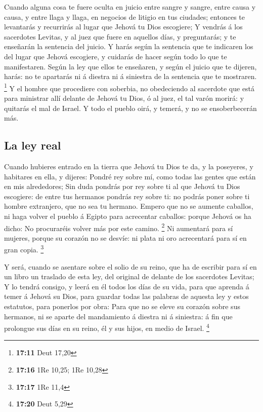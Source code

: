  Cuando alguna cosa te fuere oculta en juicio entre sangre
y sangre, entre causa y causa, y entre llaga y llaga, en negocios de
litigio en tus ciudades; entonces te levantarás y recurrirás al lugar
que Jehová tu Dios escogiere;  Y vendrás á los sacerdotes
Levitas, y al juez que fuere en aquellos días, y preguntarás; y te
enseñarán la sentencia del juicio.  Y harás según la
sentencia que te indicaren los del lugar que Jehová escogiere, y
cuidarás de hacer según todo lo que te manifestaren. 
Según la ley que ellos te enseñaren, y según el juicio que te dijeren,
harás: no te apartarás ni á diestra ni á siniestra de la sentencia que
te mostraren. \footnote{\textbf{17:11} Deut 17,20}  Y el
hombre que procediere con soberbia, no obedeciendo al sacerdote que está
para ministrar allí delante de Jehová tu Dios, ó al juez, el tal varón
morirá: y quitarás el mal de Israel.  Y todo el pueblo
oirá, y temerá, y no se ensoberbecerán más.

\hypertarget{la-ley-real}{%
\subsection{La ley real}\label{la-ley-real}}

 Cuando hubieres entrado en la tierra que Jehová tu Dios
te da, y la poseyeres, y habitares en ella, y dijeres: Pondré rey sobre
mí, como todas las gentes que están en mis alrededores; 
Sin duda pondrás por rey sobre ti al que Jehová tu Dios escogiere: de
entre tus hermanos pondrás rey sobre ti: no podrás poner sobre ti hombre
extranjero, que no sea tu hermano.  Empero que no se
aumente caballos, ni haga volver el pueblo á Egipto para acrecentar
caballos: porque Jehová os ha dicho: No procuraréis volver más por este
camino. \footnote{\textbf{17:16} 1Re 10,25; 1Re 10,28} 
Ni aumentará para sí mujeres, porque su corazón no se desvíe: ni plata
ni oro acrecentará para sí en gran copia. \footnote{\textbf{17:17} 1Re
  11,4}

 Y será, cuando se asentare sobre el solio de su reino,
que ha de escribir para sí en un libro un traslado de esta ley, del
original de delante de los sacerdotes Levitas;  Y lo
tendrá consigo, y leerá en él todos los días de su vida, para que
aprenda á temer á Jehová su Dios, para guardar todas las palabras de
aquesta ley y estos estatutos, para ponerlos por obra: 
Para que no se eleve su corazón sobre sus hermanos, ni se aparte del
mandamiento á diestra ni á siniestra: á fin que prolongue sus días en su
reino, él y sus hijos, en medio de Israel. \footnote{\textbf{17:20} Deut
  5,29}

